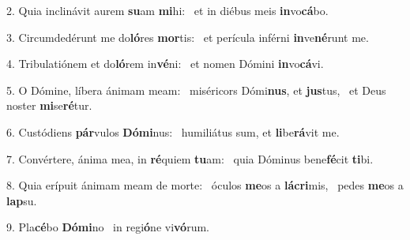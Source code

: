 2. Quia inclinávit aurem \textbf{su}am \textbf{mi}hi: \ast\  et in diébus meis \textbf{in}vo\textbf{cá}bo.\

3. Circumdedérunt me do\textbf{ló}res \textbf{mor}tis: \ast\  et perícula inférni \textbf{in}ve\textbf{né}runt me.\

4. Tribulatiónem et do\textbf{ló}rem in\textbf{vé}ni: \ast\  et nomen Dómini \textbf{in}vo\textbf{cá}vi.\

5. O Dómine, líbera ánimam meam: \dag\  miséricors Dómi\textbf{nus}, et \textbf{jus}tus, \ast\  et Deus noster \textbf{mi}se\textbf{ré}tur.\

6. Custódiens \textbf{pár}vulos \textbf{Dó}\textbf{mi}nus: \ast\  humiliátus sum, et \textbf{li}be\textbf{rá}vit me.\

7. Convértere, ánima mea, in \textbf{ré}quiem \textbf{tu}am: \ast\  quia Dóminus bene\textbf{fé}cit \textbf{ti}bi.\

8. Quia erípuit ánimam meam de morte: \dag\  óculos \textbf{me}os a \textbf{lá}\textbf{cri}mis, \ast\  pedes \textbf{me}os a \textbf{lap}su.\

9. Pla\textbf{cé}bo \textbf{Dó}\textbf{mi}no \ast\  in regi\textbf{ó}ne vi\textbf{vó}rum.\

